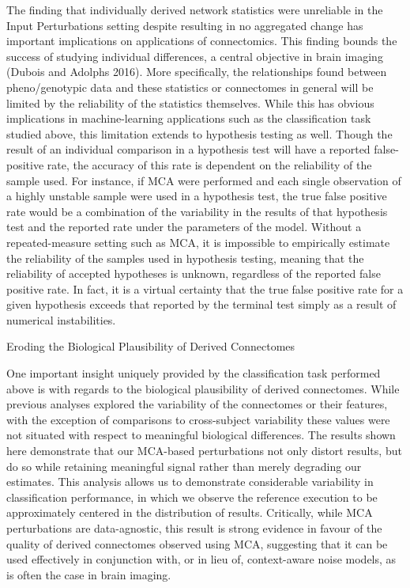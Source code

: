 \documentclass[fleqn,10pt]{SelfArx} %
\begin{document}
The finding that individually derived network statistics were unreliable in the Input Perturbations setting despite resulting in no aggregated change has important implications on applications of connectomics. This finding bounds the success of studying individual differences, a central objective in brain imaging (Dubois and Adolphs 2016). More specifically, the relationships found between pheno/genotypic data and these statistics or connectomes in general will be limited by the reliability of the statistics themselves. While this has obvious implications in machine-learning applications such as the classification task studied above, this limitation extends to hypothesis testing as well. Though the result of an individual comparison in a hypothesis test will have a reported false-positive rate, the accuracy of this rate is dependent on the reliability of the sample used. For instance, if MCA were performed and each single observation of a highly unstable sample were used in a hypothesis test, the true false positive rate would be a combination of the variability in the results of that hypothesis test and the reported rate under the parameters of the model. Without a repeated-measure setting such as MCA, it is impossible to empirically estimate the reliability of the samples used in hypothesis testing, meaning that the reliability of accepted hypotheses is unknown, regardless of the reported false positive rate. In fact, it is a virtual certainty that the true false positive rate for a given hypothesis exceeds that reported by the terminal test simply as a result of numerical instabilities.

Eroding the Biological Plausibility of Derived Connectomes

One important insight uniquely provided by the classification task performed above is with regards to the biological plausibility of derived connectomes. While previous analyses explored the variability of the connectomes or their features, with the exception of comparisons to cross-subject variability these values were not situated with respect to meaningful biological differences. The results shown here demonstrate that our MCA-based perturbations not only distort results, but do so while retaining meaningful signal rather than merely degrading our estimates. This analysis allows us to demonstrate considerable variability in classification performance, in which we observe the reference execution to be approximately centered in the distribution of results. Critically, while MCA perturbations are data-agnostic, this result is strong evidence in favour of the quality of derived connectomes observed using MCA, suggesting that it can be used effectively in conjunction with, or in lieu of, context-aware noise models, as is often the case in brain imaging. 
\end{document}
